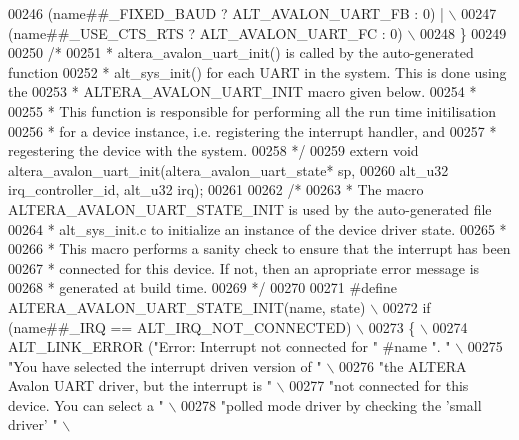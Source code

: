 \begin{DoxyCode}
00246 \textcolor{preprocessor}{     (name##\_FIXED\_BAUD ? ALT\_AVALON\_UART\_FB : 0) |    \(\backslash\)}
00247 \textcolor{preprocessor}{       (name##\_USE\_CTS\_RTS ? ALT\_AVALON\_UART\_FC : 0)   \(\backslash\)}
00248 \textcolor{preprocessor}{   \}}
00249 
00250 \textcolor{comment}{/*}
00251 \textcolor{comment}{ * altera\_avalon\_uart\_init() is called by the auto-generated function }
00252 \textcolor{comment}{ * alt\_sys\_init() for each UART in the system. This is done using the }
00253 \textcolor{comment}{ * ALTERA\_AVALON\_UART\_INIT macro given below.}
00254 \textcolor{comment}{ *}
00255 \textcolor{comment}{ * This function is responsible for performing all the run time initilisation}
00256 \textcolor{comment}{ * for a device instance, i.e. registering the interrupt handler, and }
00257 \textcolor{comment}{ * regestering the device with the system.}
00258 \textcolor{comment}{ */}
00259 \textcolor{keyword}{extern} \textcolor{keywordtype}{void} altera_avalon_uart_init(altera_avalon_uart_state* sp,
00260                                     alt_u32 irq\_controller\_id, alt_u32 irq);
00261 
00262 \textcolor{comment}{/*}
00263 \textcolor{comment}{ * The macro ALTERA\_AVALON\_UART\_STATE\_INIT is used by the auto-generated file}
00264 \textcolor{comment}{ * alt\_sys\_init.c to initialize an instance of the device driver state.}
00265 \textcolor{comment}{ *}
00266 \textcolor{comment}{ * This macro performs a sanity check to ensure that the interrupt has been}
00267 \textcolor{comment}{ * connected for this device. If not, then an apropriate error message is }
00268 \textcolor{comment}{ * generated at build time.}
00269 \textcolor{comment}{ */}
00270 
00271 \textcolor{preprocessor}{#define ALTERA\_AVALON\_UART\_STATE\_INIT(name, state)                         \(\backslash\)}
00272 \textcolor{preprocessor}{  if (name##\_IRQ == ALT\_IRQ\_NOT\_CONNECTED)                                 \(\backslash\)}
00273 \textcolor{preprocessor}{  \{                                                                        \(\backslash\)}
00274 \textcolor{preprocessor}{    ALT\_LINK\_ERROR ("Error: Interrupt not connected for " #name ". "       \(\backslash\)}
00275 \textcolor{preprocessor}{                    "You have selected the interrupt driven version of "   \(\backslash\)}
00276 \textcolor{preprocessor}{                    "the ALTERA Avalon UART driver, but the interrupt is " \(\backslash\)}
00277 \textcolor{preprocessor}{                    "not connected for this device. You can select a "     \(\backslash\)}
00278 \textcolor{preprocessor}{                    "polled mode driver by checking the 'small driver' "   \(\backslash\)}

\end{DoxyCode}
